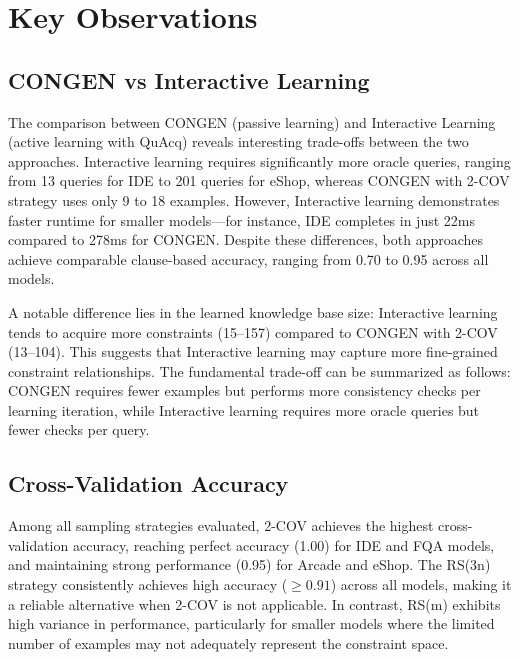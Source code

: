 \documentclass[11pt]{article}
\begin{document}
\section{Key Observations}

\subsection{CONGEN vs Interactive Learning}

The comparison between CONGEN (passive learning) and Interactive Learning (active learning with QuAcq) reveals interesting trade-offs between the two approaches. Interactive learning requires significantly more oracle queries, ranging from 13 queries for IDE to 201 queries for eShop, whereas CONGEN with 2-COV strategy uses only 9 to 18 examples. However, Interactive learning demonstrates faster runtime for smaller models---for instance, IDE completes in just 22ms compared to 278ms for CONGEN. Despite these differences, both approaches achieve comparable clause-based accuracy, ranging from 0.70 to 0.95 across all models.

A notable difference lies in the learned knowledge base size: Interactive learning tends to acquire more constraints (15--157) compared to CONGEN with 2-COV (13--104). This suggests that Interactive learning may capture more fine-grained constraint relationships. The fundamental trade-off can be summarized as follows: CONGEN requires fewer examples but performs more consistency checks per learning iteration, while Interactive learning requires more oracle queries but fewer checks per query.

\subsection{Cross-Validation Accuracy}

Among all sampling strategies evaluated, 2-COV achieves the highest cross-validation accuracy, reaching perfect accuracy (1.00) for IDE and FQA models, and maintaining strong performance (0.95) for Arcade and eShop. The RS(3n) strategy consistently achieves high accuracy ($\geq 0.91$) across all models, making it a reliable alternative when 2-COV is not applicable. In contrast, RS(m) exhibits high variance in performance, particularly for smaller models where the limited number of examples may not adequately represent the constraint space.
\end{document}
